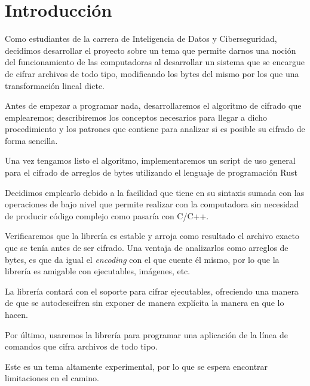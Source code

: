 \documentclass[a4paper]{article}
\begin{document}
\newpage
\section{Introducción}

Como estudiantes de la carrera de Inteligencia de Datos y Ciberseguridad,
decidimos desarrollar el proyecto sobre un tema que permite darnos una noción
del funcionamiento de las computadoras al desarrollar un sistema que se
encargue de cifrar archivos de todo tipo, modificando los bytes del mismo por
los que una transformación lineal dicte.

Antes de empezar a programar nada, desarrollaremos el algoritmo de cifrado que
emplearemos; describiremos los conceptos
necesarios para llegar a dicho procedimiento y los patrones que contiene para
analizar si es posible su cifrado de forma sencilla.

Una vez tengamos listo el algoritmo, implementaremos un script de uso
general para el cifrado de arreglos de bytes utilizando el lenguaje de
programación Rust

Decidimos emplearlo debido a la facilidad que tiene en su
sintaxis sumada con las operaciones de bajo nivel que permite realizar con la
computadora sin necesidad de producir código complejo como pasaría con
C/C++.

Verificaremos que la librería es estable y arroja como resultado el archivo
exacto que se tenía antes de ser cifrado. Una ventaja de analizarlos
como arreglos de bytes, es que da igual el \textit{encoding} con el que cuente
él mismo, por lo que la librería es amigable con ejecutables, imágenes, etc.

La librería contará con el soporte para cifrar ejecutables, ofreciendo una
manera de que se autodescifren sin exponer de manera explícita la manera en que
lo hacen.

Por último, usaremos la librería para programar una aplicación de la línea
de comandos que cifra archivos de todo tipo.

Este es un tema altamente experimental, por lo que se espera encontrar
limitaciones en el camino.
\end{document}
